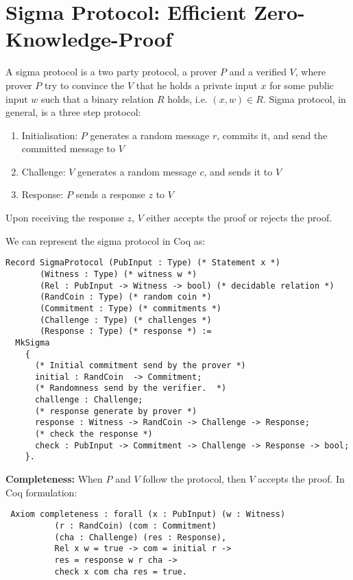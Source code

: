 \section{Sigma Protocol: Efficient Zero-Knowledge-Proof}
A sigma protocol is a two party protocol, a prover $P$ and a verified $V$, where prover $P$ try to convince the $V$ that he 
holds a private input $x$ for some public input $w$ such that a binary relation $R$ holds, i.e. $(x, w) \in R$.  Sigma protocol, 
in general, is a three step protocol:
\begin{enumerate}
\item Initialisation: $P$ generates a random message $r$, commits it, and send the committed message to $V$
\item Challenge: $V$ generates a random message $c$, and sends it to $V$
\item Response: $P$ sends a response $z$ to $V$
\end{enumerate} 

\noindent
Upon receiving the response $z$, $V$ either accepts the proof or rejects the proof.  



We can represent the sigma protocol in Coq as:
\begin{verbatim}
Record SigmaProtocol (PubInput : Type) (* Statement x *)
       (Witness : Type) (* witness w *)
       (Rel : PubInput -> Witness -> bool) (* decidable relation *)
       (RandCoin : Type) (* random coin *) 
       (Commitment : Type) (* commitments *)
       (Challenge : Type) (* challenges *) 
       (Response : Type) (* response *) :=
  MkSigma 
    {
      (* Initial commitment send by the prover *)
      initial : RandCoin  -> Commitment;
      (* Randomness send by the verifier.  *)     
      challenge : Challenge;
      (* response generate by prover *)
      response : Witness -> RandCoin -> Challenge -> Response;
      (* check the response *)
      check : PubInput -> Commitment -> Challenge -> Response -> bool;
    }.
\end{verbatim}

\noindent
\textbf{Completeness:} When $P$ and $V$ follow the protocol, then $V$ accepts the proof. In Coq formulation:
\begin{verbatim}
 Axiom completeness : forall (x : PubInput) (w : Witness) 
          (r : RandCoin) (com : Commitment) 
          (cha : Challenge) (res : Response),
          Rel x w = true -> com = initial r -> 
          res = response w r cha ->
          check x com cha res = true.
\end{verbatim}

